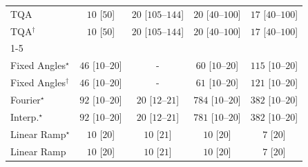 \begin{tabular}{l|cccc|}
TQA & {\cellcolor[HTML]{F6FCF4}} \color[HTML]{000000} $10$ [$50$] & {\cellcolor[HTML]{F4FBF2}} \color[HTML]{000000} $20$ [$105$--$144$] & {\cellcolor[HTML]{F4FBF2}} \color[HTML]{000000} $20$ [$40$--$100$] & {\cellcolor[HTML]{F5FBF2}} \color[HTML]{000000} $17$ [$40$--$100$] \\
TQA$^\dagger$ & {\cellcolor[HTML]{F6FCF4}} \color[HTML]{000000} $10$ [$50$] & {\cellcolor[HTML]{F4FBF2}} \color[HTML]{000000} $20$ [$105$--$144$] & {\cellcolor[HTML]{F4FBF2}} \color[HTML]{000000} $20$ [$40$--$100$] & {\cellcolor[HTML]{F5FBF2}} \color[HTML]{000000} $17$ [$40$--$100$] \\
\cline{1-5}
\multicolumn{5}{c}{\rule{0pt}{8pt}SV} \\
\midrule
Fixed Angles$^\star$ & {\cellcolor[HTML]{EFF9EC}} \color[HTML]{000000} $46$ [$10$--$20$] & {\cellcolor[HTML]{000000}} \color[HTML]{F1F1F1} {\cellcolor{white}} \color{black} - & {\cellcolor[HTML]{EDF8E9}} \color[HTML]{000000} $60$ [$10$--$20$] & {\cellcolor[HTML]{E1F3DC}} \color[HTML]{000000} $115$ [$10$--$20$] \\
Fixed Angles$^\dagger$ & {\cellcolor[HTML]{EFF9EC}} \color[HTML]{000000} $46$ [$10$--$20$] & {\cellcolor[HTML]{000000}} \color[HTML]{F1F1F1} {\cellcolor{white}} \color{black} - & {\cellcolor[HTML]{ECF8E8}} \color[HTML]{000000} $61$ [$10$--$20$] & {\cellcolor[HTML]{DFF3DA}} \color[HTML]{000000} $121$ [$10$--$20$] \\
Fourier$^\star$ & {\cellcolor[HTML]{E7F6E2}} \color[HTML]{000000} $92$ [$10$--$20$] & {\cellcolor[HTML]{F4FBF2}} \color[HTML]{000000} $20$ [$12$--$21$] & {\cellcolor[HTML]{00441B}} \color[HTML]{F1F1F1} $784$ [$10$--$20$] & {\cellcolor[HTML]{79C67A}} \color[HTML]{000000} $382$ [$10$--$20$] \\
Interp.$^\star$ & {\cellcolor[HTML]{E7F6E2}} \color[HTML]{000000} $92$ [$10$--$20$] & {\cellcolor[HTML]{F4FBF2}} \color[HTML]{000000} $20$ [$12$--$21$] & {\cellcolor[HTML]{00441B}} \color[HTML]{F1F1F1} $781$ [$10$--$20$] & {\cellcolor[HTML]{79C67A}} \color[HTML]{000000} $382$ [$10$--$20$] \\
Linear Ramp$^\star$ & {\cellcolor[HTML]{F6FCF4}} \color[HTML]{000000} $10$ [$20$] & {\cellcolor[HTML]{F6FCF4}} \color[HTML]{000000} $10$ [$21$] & {\cellcolor[HTML]{F6FCF4}} \color[HTML]{000000} $10$ [$20$] & {\cellcolor[HTML]{F6FCF4}} \color[HTML]{000000} $7$ [$20$] \\
Linear Ramp & {\cellcolor[HTML]{F6FCF4}} \color[HTML]{000000} $10$ [$20$] & {\cellcolor[HTML]{F6FCF4}} \color[HTML]{000000} $10$ [$21$] & {\cellcolor[HTML]{F6FCF4}} \color[HTML]{000000} $10$ [$20$] & {\cellcolor[HTML]{F6FCF4}} \color[HTML]{000000} $7$ [$20$] \\

\end{tabular}
